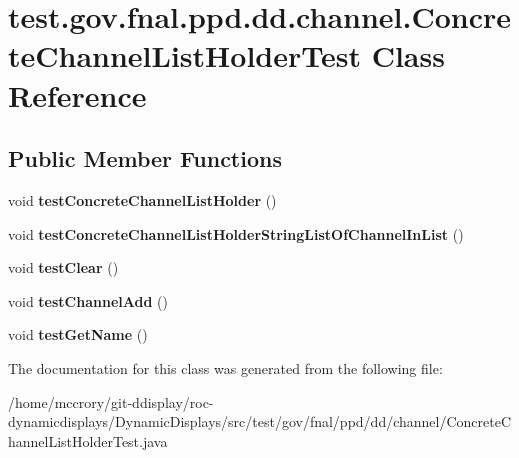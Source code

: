 \hypertarget{classtest_1_1gov_1_1fnal_1_1ppd_1_1dd_1_1channel_1_1ConcreteChannelListHolderTest}{\section{test.\-gov.\-fnal.\-ppd.\-dd.\-channel.\-Concrete\-Channel\-List\-Holder\-Test Class Reference}
\label{classtest_1_1gov_1_1fnal_1_1ppd_1_1dd_1_1channel_1_1ConcreteChannelListHolderTest}
}
\subsection*{Public Member Functions}
\begin{DoxyCompactItemize}
\item 
\hypertarget{classtest_1_1gov_1_1fnal_1_1ppd_1_1dd_1_1channel_1_1ConcreteChannelListHolderTest_a18061e5d2be01d5d9e5d6c0236c2110c}{void {\bfseries test\-Concrete\-Channel\-List\-Holder} ()}\label{classtest_1_1gov_1_1fnal_1_1ppd_1_1dd_1_1channel_1_1ConcreteChannelListHolderTest_a18061e5d2be01d5d9e5d6c0236c2110c}

\item 
\hypertarget{classtest_1_1gov_1_1fnal_1_1ppd_1_1dd_1_1channel_1_1ConcreteChannelListHolderTest_aab0ce5c132b4138233bf5bc98fc0f884}{void {\bfseries test\-Concrete\-Channel\-List\-Holder\-String\-List\-Of\-Channel\-In\-List} ()}\label{classtest_1_1gov_1_1fnal_1_1ppd_1_1dd_1_1channel_1_1ConcreteChannelListHolderTest_aab0ce5c132b4138233bf5bc98fc0f884}

\item 
\hypertarget{classtest_1_1gov_1_1fnal_1_1ppd_1_1dd_1_1channel_1_1ConcreteChannelListHolderTest_a3b0a1f86dcd65fc962a06a2c788ef872}{void {\bfseries test\-Clear} ()}\label{classtest_1_1gov_1_1fnal_1_1ppd_1_1dd_1_1channel_1_1ConcreteChannelListHolderTest_a3b0a1f86dcd65fc962a06a2c788ef872}

\item 
\hypertarget{classtest_1_1gov_1_1fnal_1_1ppd_1_1dd_1_1channel_1_1ConcreteChannelListHolderTest_a187c2eb4012ac72a2e2ba0196a33cfac}{void {\bfseries test\-Channel\-Add} ()}\label{classtest_1_1gov_1_1fnal_1_1ppd_1_1dd_1_1channel_1_1ConcreteChannelListHolderTest_a187c2eb4012ac72a2e2ba0196a33cfac}

\item 
\hypertarget{classtest_1_1gov_1_1fnal_1_1ppd_1_1dd_1_1channel_1_1ConcreteChannelListHolderTest_a5a2bdc4009cefa078dd325b6a6cb31eb}{void {\bfseries test\-Get\-Name} ()}\label{classtest_1_1gov_1_1fnal_1_1ppd_1_1dd_1_1channel_1_1ConcreteChannelListHolderTest_a5a2bdc4009cefa078dd325b6a6cb31eb}

\end{DoxyCompactItemize}


The documentation for this class was generated from the following file\-:\begin{DoxyCompactItemize}
\item 
/home/mccrory/git-\/ddisplay/roc-\/dynamicdisplays/\-Dynamic\-Displays/src/test/gov/fnal/ppd/dd/channel/Concrete\-Channel\-List\-Holder\-Test.\-java\end{DoxyCompactItemize}
